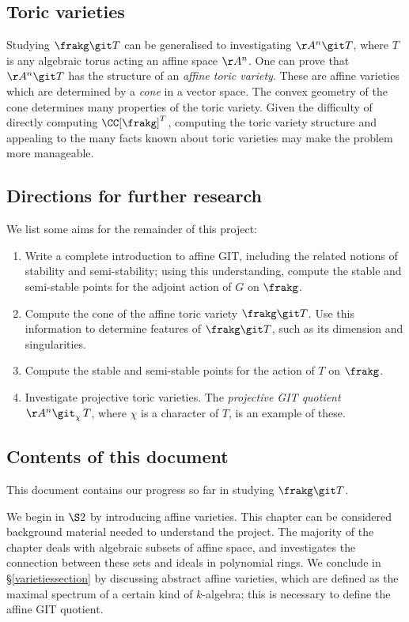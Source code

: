 \documentclass[12pt]{amsart}
\theoremstyle{plain}
\begin{document}
\subsection{Toric varieties}
Studying $\frakg \git T$ can be generalised to investigating $\AA^n \git T$, where $T$ is any algebraic torus acting an affine space $\AA^n$.
One can prove that $\AA^n \git T$ has the structure of an \emph{affine toric variety}.
These are affine varieties which are determined by a \emph{cone} in a vector space.
The convex geometry of the cone determines many properties of the toric variety.
Given the difficulty of directly computing $\CC[\frakg]^T$, computing the toric variety structure and appealing to the many facts known about toric varieties may make the problem more manageable.

\subsection{Directions for further research}
We list some aims for the remainder of this project:
\begin{enumerate}
\item
Write a complete introduction to affine GIT, including the related notions of stability and semi-stability;
using this understanding, compute the stable and semi-stable points for the adjoint action of $G$ on $\frakg$.

\item
Compute the cone of the affine toric variety $\frakg \git T$.
Use this information to determine features of $\frakg \git T$, such as its dimension and singularities.

\item
Compute the stable and semi-stable points for the action of $T$ on $\frakg$.

\item
Investigate projective toric varieties.
The \emph{projective GIT quotient} $\AA^n \git_\chi \, T$, where $\chi$ is a character of $T$, is an example of these.
\end{enumerate}

\subsection{Contents of this document}
This document contains our progress so far in studying $\frakg \git T$.

We begin in $\S 2$ by introducing affine varieties.
This chapter can be considered background material needed to understand the project.
The majority of the chapter deals with algebraic subsets of affine space, and investigates the connection between these sets and ideals in polynomial rings.
We conclude in \S \ref{varietiessection} by discussing abstract affine varieties, which are defined as the maximal spectrum of a certain kind of $k$-algebra;
this is necessary to define the affine GIT quotient.
\end{document}
